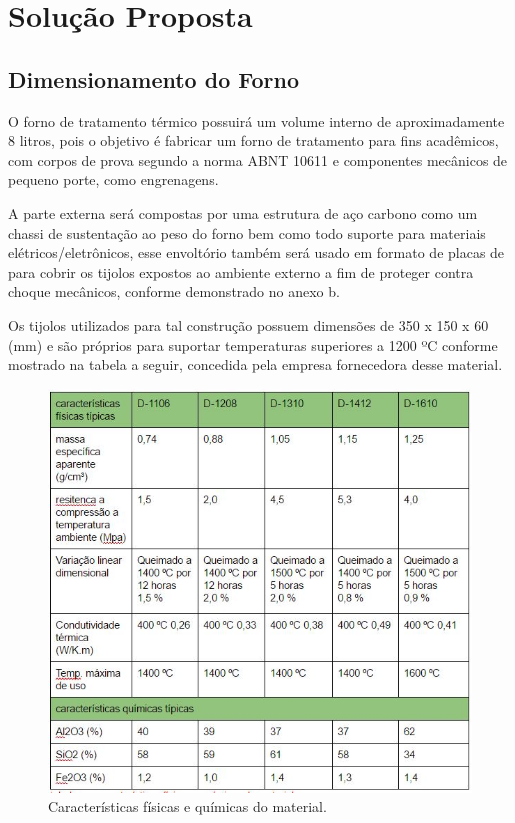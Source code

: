 \chapter[Solução Proposta]{Solução Proposta}


\section{Dimensionamento do Forno}

O forno de tratamento térmico possuirá um volume interno de aproximadamente 8 litros, pois o objetivo é fabricar um forno de tratamento para fins acadêmicos, com corpos de prova segundo a norma ABNT 10611 e componentes mecânicos de pequeno porte, como engrenagens.
 
A parte externa será compostas por uma estrutura de aço carbono como um chassi de sustentação ao peso do forno bem como todo suporte para materiais elétricos/eletrônicos, esse envoltório também será usado em formato de placas de para cobrir os tijolos expostos ao ambiente externo a fim de proteger contra choque mecânicos, conforme demonstrado no anexo b.

Os tijolos utilizados para tal construção possuem dimensões de 350 x 150 x 60 (mm) e são próprios para suportar temperaturas superiores a 1200 ºC conforme mostrado na tabela a seguir, concedida pela empresa fornecedora desse material.

\begin{figure}[h]
	\centering
	\label{tabela_dimensoes}
	\includegraphics[keepaspectratio=true,scale=1.0]{figuras/tabela_dimensoes.JPG}
	\caption{Características físicas e químicas do material.}
\end{figure}

